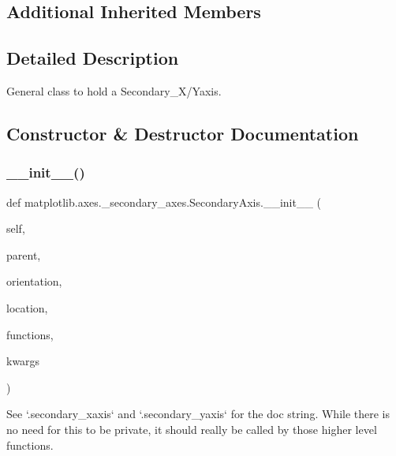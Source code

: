 \subsection*{Additional Inherited Members}


\subsection{Detailed Description}
\begin{DoxyVerb}General class to hold a Secondary_X/Yaxis.
\end{DoxyVerb}
 

\subsection{Constructor \& Destructor Documentation}
\mbox{\label{classmatplotlib_1_1axes_1_1__secondary__axes_1_1SecondaryAxis_ae2fe56e476a322bc7cfbd1fa0f3592a8}} 
\subsubsection{\texorpdfstring{\+\_\+\+\_\+init\+\_\+\+\_\+()}{\_\_init\_\_()}}
{\footnotesize\ttfamily def matplotlib.\+axes.\+\_\+secondary\+\_\+axes.\+Secondary\+Axis.\+\_\+\+\_\+init\+\_\+\+\_\+ (\begin{DoxyParamCaption}\item[{}]{self,  }\item[{}]{parent,  }\item[{}]{orientation,  }\item[{}]{location,  }\item[{}]{functions,  }\item[{}]{kwargs }\end{DoxyParamCaption})}

\begin{DoxyVerb}See `.secondary_xaxis` and `.secondary_yaxis` for the doc string.
While there is no need for this to be private, it should really be
called by those higher level functions.
\end{DoxyVerb}
 


